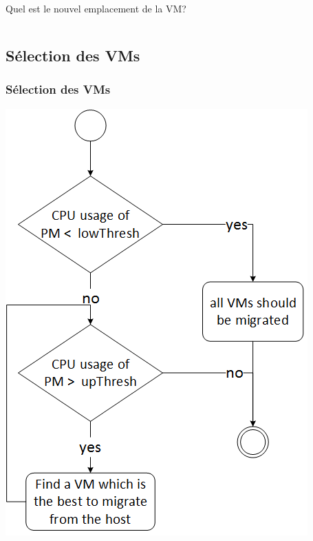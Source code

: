 \documentclass[xcolor=dvipsnames]{beamer}
\begin{document}
\begin{frame}
\begin{columns}
\begin{column}{0.55\textwidth}
\begin{block}{}
\begin{minipage}{\textwidth}

Quel  est le nouvel emplacement de la VM?
\end{minipage}
\end{block}
\end{column}
\end{columns}

\end{frame}
\subsection{Sélection des VMs}
\begin{frame}
\frametitle{Sélection des VMs}
\begin{center}
\includegraphics[scale=0.4]{smm.png}
\end{center}
\end{frame}
\end{document}
